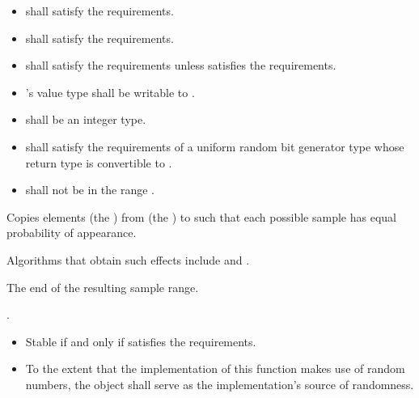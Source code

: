 \begin{itemdescr}
\pnum
\requires
\begin{itemize}
\item
{} shall satisfy the  requirements.
\item
{} shall satisfy the  requirements.
\item
{} shall satisfy the  requirements
unless  satisfies the  requirements.
\item
{}'s value type shall be writable to .
\item
{} shall be an integer type.
\item
{}
shall satisfy the requirements of a uniform random bit generator type
whose return type is convertible to .
\item
{} shall not be in the range .
\end{itemize}

\pnum
\effects
Copies  elements (the )
from  (the ) to 
such that each possible sample has equal probability of appearance.
\begin{note}
Algorithms that obtain such effects include 
and .
\end{note}

\pnum
\returns
The end of the resulting sample range.

\pnum
\complexity
{}.

\pnum
\remarks
\begin{itemize}
\item
Stable if and only if  satisfies the
 requirements.
\item
To the extent that the implementation of this function makes use of
random numbers, the object  shall serve as the
implementation's source of randomness.
\end{itemize}
\end{itemdescr}


